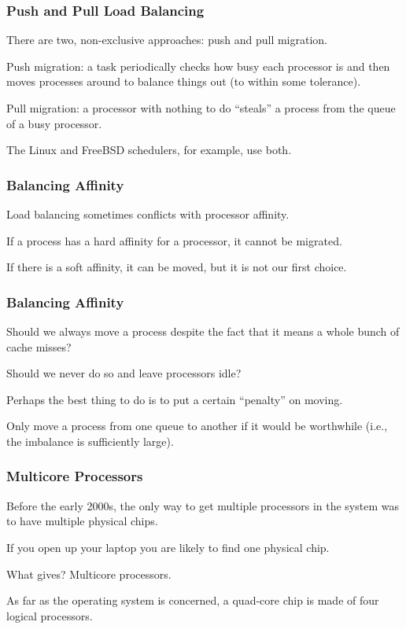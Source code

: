 \begin{frame}
\frametitle{Push and Pull Load Balancing}

There are two, non-exclusive approaches: \alert{push} and \alert{pull} migration. 


Push migration: a task periodically checks how busy each processor is and then moves processes around to balance things out (to within some tolerance). 

Pull migration: a processor with nothing to do ``steals'' a process from the queue of a busy processor. 

The Linux and FreeBSD schedulers, for example, use both.

\end{frame}

\begin{frame}
\frametitle{Balancing Affinity}

Load balancing sometimes conflicts with processor affinity. 

If a process has a hard affinity for a processor, it cannot be migrated. 

If there is a soft affinity, it can be moved, but it is not our first choice.

\end{frame}

\begin{frame}
\frametitle{Balancing Affinity}

Should we always move a process despite the fact that it means a whole bunch of cache misses?

Should we never do so and leave processors idle? 

Perhaps the best thing to do is to put a certain ``penalty'' on moving.

Only move a process from one queue to another if it would be worthwhile (i.e., the imbalance is sufficiently large).

\end{frame}

\begin{frame}
\frametitle{Multicore Processors}

Before the early 2000s, the only way to get multiple processors in the system was to have multiple physical chips. 

If you open up your laptop you are likely to find one physical chip. 

What gives? \alert{Multicore processors}. 

As far as the operating system is concerned, a quad-core chip is made of four logical processors.

\end{frame}

